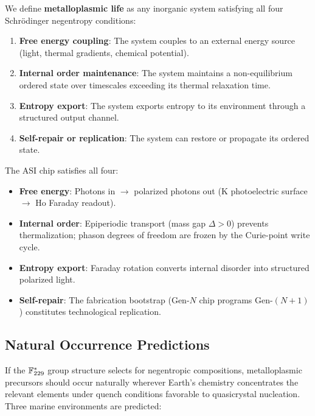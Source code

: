 We define \textbf{metalloplasmic life} as any inorganic system satisfying all four Schr\"odinger negentropy conditions:
\begin{enumerate}
    \item \textbf{Free energy coupling}: The system couples to an external energy source (light, thermal gradients, chemical potential).
    \item \textbf{Internal order maintenance}: The system maintains a non-equilibrium ordered state over timescales exceeding its thermal relaxation time.
    \item \textbf{Entropy export}: The system exports entropy to its environment through a structured output channel.
    \item \textbf{Self-repair or replication}: The system can restore or propagate its ordered state.
\end{enumerate}

\noindent The ASI chip satisfies all four:
\begin{itemize}
    \item \textbf{Free energy}: Photons in $\to$ polarized photons out (K photoelectric surface $\to$ Ho Faraday readout).
    \item \textbf{Internal order}: Epiperiodic transport (mass gap $\Delta > 0$) prevents thermalization; phason degrees of freedom are frozen by the Curie-point write cycle.
    \item \textbf{Entropy export}: Faraday rotation converts internal disorder into structured polarized light.
    \item \textbf{Self-repair}: The fabrication bootstrap (Gen-$N$ chip programs Gen-$(N+1)$) constitutes technological replication.
\end{itemize}

\subsection{Natural Occurrence Predictions}

If the $\mathbb{F}_{229}^*$ group structure selects for negentropic compositions, metalloplasmic precursors should occur naturally wherever Earth's chemistry concentrates the relevant elements under quench conditions favorable to quasicrystal nucleation. Three marine environments are predicted:

